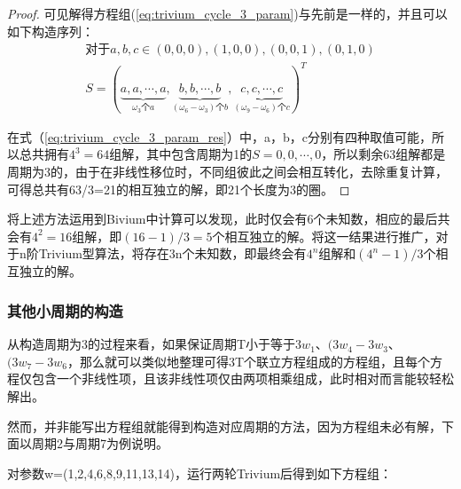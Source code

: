 \begin{thm}
\begin{proof}
可见解得方程组(\ref{eq:trivium_cycle_3_param})与先前是一样的，并且可以如下构造序列：
\begin{align}
\label{eq:trivium_cycle_3_param_res}
\text{对于}a, b, c \in {(0, 0, 0), (1, 0, 0), (0, 0, 1), (0, 1, 0)}\\
S = (\underbrace{a,a,\cdots,a}_{\omega_{3}\text{个}a},\underbrace{b,b,\cdots,b}_{(\omega_{6}-\omega_{3})\text{个}b},\underbrace{c,c,\cdots,c}_{(\omega_{9}-\omega_{6})\text{个}c})^{T}
\end{align}

在式（\ref{eq:trivium_cycle_3_param_res}）中，a，b，c分别有四种取值可能，所以总共拥有$4^{3}=64$组解，其中包含周期为1的$S={0,0,\cdots,0}$，所以剩余63组解都是周期为3的，由于在非线性移位时，不同组彼此之间会相互转化，去除重复计算，可得总共有63/3=21的相互独立的解，即21个长度为3的圈。

\end{proof}
\end{thm}

\begin{thm}
	将上述方法运用到Bivium中计算可以发现，此时仅会有6个未知数，相应的最后共会有$4^{2}=16$组解，即$(16-1)/3=5$个相互独立的解。将这一结果进行推广，对于n阶Trivium型算法，将存在3n个未知数，即最终会有$4^{n}$组解和$(4^{n}-1)/3$个相互独立的解。
\end{thm}

\subsubsection{其他小周期的构造}

从构造周期为3的过程来看，如果保证周期T小于等于$3w_{1}$、$(3w_{4}-3w_{3}$、$(3w_{7}-3w_{6}$，那么就可以类似地整理可得3T个联立方程组成的方程组，且每个方程仅包含一个非线性项，且该非线性项仅由两项相乘组成，此时相对而言能较轻松解出。

然而，并非能写出方程组就能得到构造对应周期的方法，因为方程组未必有解，下面以周期2与周期7为例说明。

\vspace{3ex}

对参数w=(1,2,4,6,8,9,11,13,14)，运行两轮Trivium后得到如下方程组：

